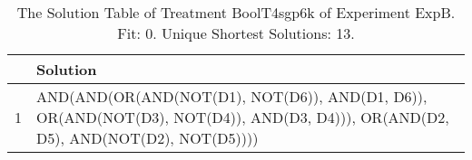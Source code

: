 \begin{table}[ht]
\centering
\begin{tabular}{rp{9cm}}
  \hline
 & Solution \\ 
  \hline
1 & AND(AND(OR(AND(NOT(D1), NOT(D6)), AND(D1, D6)), OR(AND(NOT(D3), NOT(D4)), AND(D3, D4))), OR(AND(D2, D5), AND(NOT(D2), NOT(D5)))) \\ 
   \hline
\end{tabular}
\caption{The Solution Table of Treatment BoolT4sgp6k of Experiment ExpB. Fit: 0. Unique Shortest Solutions: 13.} 
\end{table}
